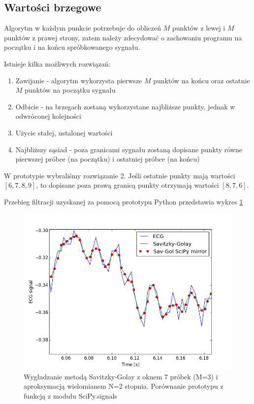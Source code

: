 \subsection{Wartości brzegowe}
Algorytm w każdym punkcie potrzebuje do obliczeń $M$ punktów z lewej i $M$ punktów z prawej strony, zatem należy zdecydować o zachowaniu programu na początku i na końcu spróbkowanego sygnału.

Istnieje kilka możliwych rozwiązań:
\begin{enumerate}
\item Zawijanie - algorytm wykorzysta pierwsze $M$ punktów na końcu oraz ostatnie $M$ punktów na początku sygnału
\item Odbicie - na brzegach zostaną wykorzystane najbliższe punkty, jednak w odwróconej kolejności
\item Użycie stałej, ustalonej wartości
\item Najbliższy sąsiad - poza granicami sygnału zostaną dopisane punkty równe pierwszej próbce (na początku) i ostatniej próbce (na końcu)
\end{enumerate}

W prototypie wybraliśmy rozwiązanie 2. Jeśli ostatnie punkty mają wartości $[6, 7, 8, 9]$, to dopisane poza prawą granicą punkty otrzymają wartości $[8, 7, 6]$.


Przebieg filtracji uzyskanej za pomocą prototypu Python przedstawia wykres \ref{rys:savitzky_py}

\begin{figure}[!htb]
  \begin{center}
    \includegraphics[scale=0.8]
    {img/prototype.png}
  \end{center}
  \caption{Wygładzanie metodą Savitzky-Golay z oknem 7 próbek (M=3) i aproksymacją wielomianem N=2 stopnia. Porównanie prototypu z funkcją z modułu SciPy.signals}
  \label{rys:savitzky_py}
\end{figure}

